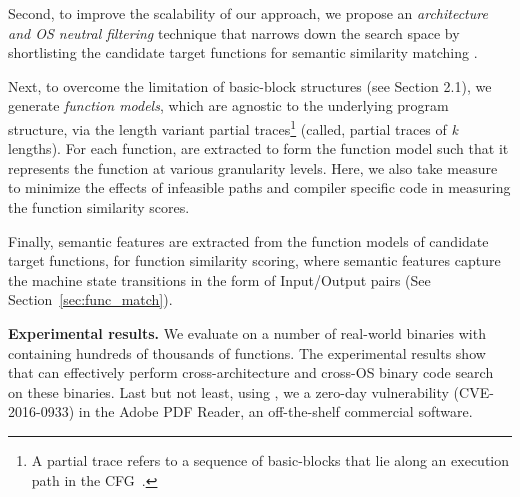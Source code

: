 Second, to improve the scalability of our approach, we propose an \emph{architecture and OS neutral filtering} technique that narrows down the search space by shortlisting the candidate target functions for semantic similarity matching .

Next, to overcome the limitation of basic-block structures (see Section 2.1), we generate \emph{function models}, which are agnostic to the underlying program structure, via the length variant partial traces\footnote{A partial trace refers to a sequence of basic-blocks that lie along an execution path in the CFG~\cite{DBLP:conf/pldi/DavidY14}.} (called, partial traces of \emph{k} lengths). For each function,  are extracted to form the function model such that it represents the function at various granularity levels.
Here, we also take measure to minimize the effects of infeasible paths and compiler specific code in measuring the function similarity scores.

Finally, semantic features are extracted from the function models of candidate target functions, for function similarity scoring, where semantic features capture the machine state transitions in the form of Input/Output pairs (See Section~\ref{sec:func_match}).


\noindent\textbf{Experimental results.} We evaluate \tool on a number of real-world binaries with containing hundreds of thousands of functions.
The experimental results show that \tool can effectively perform cross-architecture and cross-OS binary code search on these binaries. 
Last but not least, using \tool, we  a zero-day vulnerability (CVE-2016-0933) in the Adobe PDF Reader, an off-the-shelf commercial software.\\

